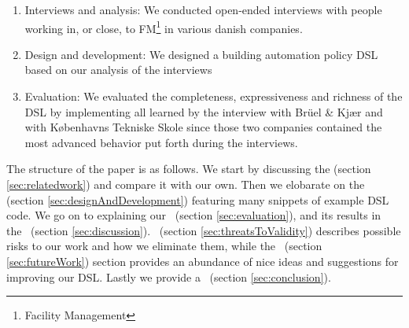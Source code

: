 \begin{enumerate}
	\item Interviews and analysis: We conducted open-ended interviews with people working in, or close, to FM\footnote{Facility Management} in various danish companies.
	\item Design and development: We designed a building automation policy DSL based on our analysis of the interviews
	\item Evaluation: We evaluated the completeness, expressiveness and richness of the DSL by implementing all learned by the interview with Br\"{u}el \& Kj\ae r and with K\o benhavns Tekniske Skole since those two companies contained the most advanced behavior put forth during the interviews.
\end{enumerate}

The structure of the paper is as follows. We start by discussing the  (section \ref{sec:relatedwork}) and compare it with our own. Then we elobarate on the~  (section \ref{sec:designAndDevelopment}) featuring many snippets of example DSL code. We go on to explaining our~  (section \ref{sec:evaluation}), and its results in the~ (section \ref{sec:discussion}). ~(section \ref{sec:threatsToValidity}) describes possible risks to our work and how we eliminate them, while the ~(section \ref{sec:futureWork}) section provides an abundance of nice ideas and suggestions for improving our DSL. Lastly we provide a~ (section \ref{sec:conclusion}).